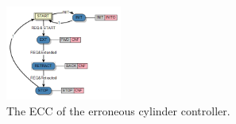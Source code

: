 \documentclass[conference]{IEEEtran}
\begin{document}
\begin{figure}[t]
    \centering
    \includegraphics[width=0.34\textwidth]{pic/errctlecc.png}
    \caption{The ECC of the erroneous cylinder controller.}
    \label{fig:errctlecc}
\end{figure}








\end{document}
